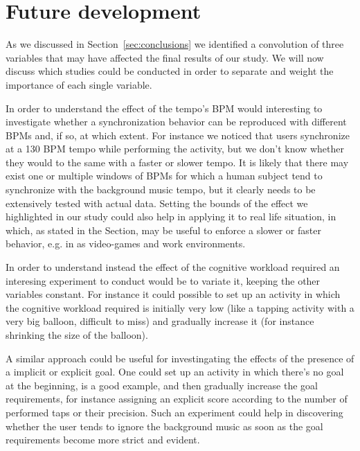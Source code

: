 
\section{Future development}
\label{sec:future}
As we discussed in Section~\ref{sec:conclusions} we identified a convolution of three variables that may have affected the final results of our study.
We will now discuss which studies could be conducted in order to separate and weight the importance of each single variable.

In order to understand the effect of the tempo's BPM would interesting to investigate whether a synchronization behavior can be reproduced with different BPMs and, if so, at which extent.
For instance we noticed that users synchronize at a 130 BPM tempo while performing the \testfirst activity, but we don't know whether they would to the same with a faster or slower tempo.
It is likely that there may exist one or multiple windows of BPMs for which a human subject tend to synchronize with the background music tempo, but it clearly needs to be extensively tested with actual data.
Setting the bounds of the effect we highlighted in our study could also help in applying it to real life situation, in which, as stated in the  Section, may be useful to enforce a slower or faster behavior, e.g. in as video-games and work environments.

In order to understand instead the effect of the cognitive workload required an interesing experiment to conduct would be to variate it, keeping the other variables constant. For instance it could possible to set up an activity in which the cognitive workload required  is initially very low (like a tapping activity with a very big balloon, difficult to miss) and gradually increase it (for instance shrinking the size of the balloon).

A similar approach could be useful for investingating the effects of the presence of a implicit or explicit goal. One could set up an activity in which there's no goal at the beginning, \testfirst is a good example, and then gradually increase the goal requirements, for instance assigning an explicit score according to the number of performed taps or their precision.
Such an experiment could help in discovering whether the user tends to ignore the background music as soon as the goal requirements become more strict and evident.